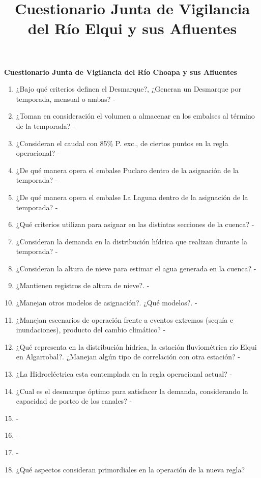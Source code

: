 \documentclass[10pt,]{article}
\title{Cuestionario Junta de Vigilancia del Río Elqui y sus Afluentes}
\date{ }                                           %
\begin{document}
	\begin{large}
	\begin{center}
		\textbf{Cuestionario Junta de Vigilancia del Río Choapa y sus Afluentes}\bigskip
	\end{center}
	\end{large}
	
	
\begin{enumerate}

<<<<<<< HEAD
-\item ¿Bajo qué criterios definen el Desmarque?, ¿Generan un Desmarque por temporada, mensual o ambas?		
 -\item ¿Toman en consideración el volumen a almacenar en los embalses al término de la temporada?		
 -\item ¿Consideran el caudal con 85\% P. exc., de ciertos puntos en la regla operacional?		
 -\item ¿De qué manera opera el embalse Puclaro dentro de la asignación de la temporada?		
 -\item ¿De qué manera opera el embalse La Laguna dentro de la asignación de la temporada?		
 -\item ¿Qué criterios utilizan para asignar en las distintas secciones de la cuenca?		
 -\item ¿Consideran la demanda en la distribución hídrica que realizan durante la temporada?		
 -\item ¿Consideran la altura de nieve para estimar el agua generada en la cuenca? 		
 -\item ¿Mantienen registros de altura de nieve?.		
 -\item ¿Manejan otros modelos de asignación?. ¿Qué modelos?.		
 -\item ¿Manejan escenarios de operación frente a eventos extremos (sequía e inundaciones), producto del cambio climático?		
 -\item ¿Qué representa en la distribución hídrica, la estación fluviométrica río Elqui en Algarrobal?. ¿Manejan algún tipo de correlación con otra estación?		
 -\item ¿La Hidroeléctrica esta contemplada en la regla operacional actual?		
 -\item ¿Cual es el desmarque óptimo para satisfacer la demanda, considerando la capacidad de porteo de los canales?		
 -\item 		
 -\item 		
 -\item 		
 -\item ¿Qué aspectos consideran primordiales en la operación de la nueva regla?		

\end{enumerate}
\end{document}
